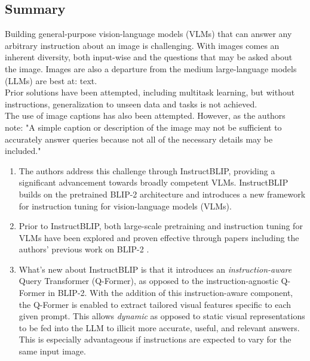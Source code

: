 \documentclass[12pt, letterpaper]{article}
\begin{document}
\begin{spacing}{1.10}
\section{Summary}
\label{sec:summary}
\leavevmode\par\noindent
Building general-purpose vision-language models (VLMs) that can answer any arbitrary instruction about an image is challenging. With images comes an inherent diversity, both input-wise and the questions that may be asked about the image. Images are also a departure from the medium large-language models (LLMs) are best at: text.\\

Prior solutions have been attempted, including multitask learning, but without instructions, generalization to unseen data and tasks is not achieved.\\

The use of image captions has also been attempted. However, as the authors note: "A simple caption or description of the image may not be sufficient to accurately answer queries because not all of the necessary details may be included."\\

\begin{enumerate}
    \item The authors address this challenge through InstructBLIP, providing a significant advancement towards broadly competent VLMs. InstructBLIP builds on the pretrained BLIP-2 architecture and introduces a new framework for instruction tuning for vision-language models (VLMs).
    \item Prior to InstructBLIP, both large-scale pretraining and instruction tuning for VLMs have been explored and proven effective through papers including the authors' previous work on BLIP-2 \cite{li2023blip2bootstrappinglanguageimagepretraining}.
    \item What's new about InstructBLIP is that it introduces an \emph{instruction-aware} Query Transformer (Q-Former), as opposed to the instruction-agnostic Q-Former in BLIP-2. With the addition of this instruction-aware component, the Q-Former is enabled to extract tailored visual features specific to each given prompt. This allows \emph{dynamic} as opposed to static visual representations to be fed into the LLM to illicit more accurate, useful, and relevant answers. This is especially advantageous if instructions are expected to vary for the same input image.\\
\end{enumerate}


\end{spacing}
\end{document}
